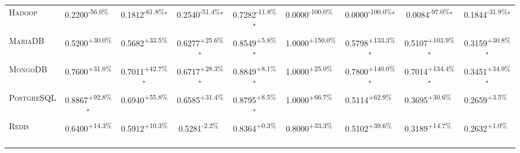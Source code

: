 \begin{table}[htbp]
\begin{tabular}{l|cccc|cccc}
\textsc{Hadoop} & \cellcolor{red!30}0.2200\textsuperscript{-56.0\%}$^{\,\,\,}$ & \cellcolor{red!30}0.1812\textsuperscript{-61.8\%}$^\star$ & \cellcolor{red!30}0.2540\textsuperscript{-51.4\%}$^\star$ & \cellcolor{red!30}0.7282\textsuperscript{-11.8\%}$^\star$ & \cellcolor{red!30}0.0000\textsuperscript{-100.0\%}$^{\,\,\,}$ & \cellcolor{red!30}0.0000\textsuperscript{-100.0\%}$^\star$ & \cellcolor{red!30}0.0084\textsuperscript{-97.0\%}$^\star$ & \cellcolor{red!30}0.1844\textsuperscript{-31.9\%}$^\star$ \\
\textsc{MariaDB} & \cellcolor{green!30}0.5200\textsuperscript{+30.0\%}$^{\,\,\,}$ & \cellcolor{green!30}0.5682\textsuperscript{+33.5\%}$^{\,\,\,}$ & \cellcolor{green!30}0.6277\textsuperscript{+25.6\%}$^\star$ & \cellcolor{green!30}0.8549\textsuperscript{+5.8\%}$^\star$ & \cellcolor{green!30}1.0000\textsuperscript{+150.0\%}$^{\,\,\,}$ & \cellcolor{green!30}0.5798\textsuperscript{+133.3\%}$^\star$ & \cellcolor{green!30}0.5107\textsuperscript{+103.9\%}$^\star$ & \cellcolor{green!30}0.3159\textsuperscript{+30.8\%}$^\star$ \\
\textsc{MongoDB} & \cellcolor{green!30}0.7600\textsuperscript{+31.0\%}$^{\,\,\,}$ & \cellcolor{green!30}0.7011\textsuperscript{+42.7\%}$^\star$ & \cellcolor{green!30}0.6717\textsuperscript{+28.3\%}$^\star$ & \cellcolor{green!30}0.8849\textsuperscript{+8.1\%}$^\star$ & \cellcolor{green!30}1.0000\textsuperscript{+25.0\%}$^{\,\,\,}$ & \cellcolor{green!30}0.7800\textsuperscript{+140.0\%}$^\star$ & \cellcolor{green!30}0.7014\textsuperscript{+134.4\%}$^\star$ & \cellcolor{green!30}0.3451\textsuperscript{+34.9\%}$^\star$ \\
\textsc{PostgreSQL} & \cellcolor{green!30}0.8867\textsuperscript{+92.8\%}$^\star$ & \cellcolor{green!30}0.6940\textsuperscript{+55.8\%}$^{\,\,\,}$ & \cellcolor{green!30}0.6585\textsuperscript{+31.4\%}$^{\,\,\,}$ & \cellcolor{green!30}0.8795\textsuperscript{+8.5\%}$^\star$ & \cellcolor{green!30}1.0000\textsuperscript{+66.7\%}$^{\,\,\,}$ & \cellcolor{green!30}0.5114\textsuperscript{+62.9\%}$^{\,\,\,}$ & \cellcolor{green!30}0.3695\textsuperscript{+30.6\%}$^{\,\,\,}$ & \cellcolor{green!30}0.2659\textsuperscript{+3.5\%}$^{\,\,\,}$ \\
\textsc{Redis} & \cellcolor{green!30}0.6400\textsuperscript{+14.3\%}$^{\,\,\,}$ & \cellcolor{green!30}0.5912\textsuperscript{+10.3\%}$^{\,\,\,}$ & \cellcolor{red!30}0.5281\textsuperscript{-2.2\%}$^{\,\,\,}$ & \cellcolor{green!30}0.8364\textsuperscript{+0.3\%}$^{\,\,\,}$ & \cellcolor{green!30}0.8000\textsuperscript{+33.3\%}$^{\,\,\,}$ & \cellcolor{green!30}0.5102\textsuperscript{+39.6\%}$^{\,\,\,}$ & \cellcolor{green!30}0.3189\textsuperscript{+14.7\%}$^{\,\,\,}$ & \cellcolor{green!30}0.2632\textsuperscript{+1.0\%}$^{\,\,\,}$ \\

\end{tabular}
\end{table}
